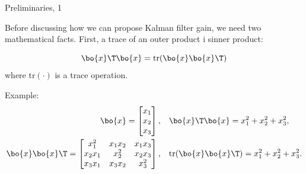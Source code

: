 \documentclass{beamer}
\begin{document}
\begin{frame}{Preliminaries, 1}
	\begin{flushleft}
		
		Before discussing how we can propose Kalman filter gain, we need two mathematical facts. First, a trace of an outer product i sinner product:
		
		\begin{equation}
			\bo{x}\T \bo{x} = \text{tr}(\bo{x}\bo{x}\T)
		\end{equation}
		where $\text{tr}(\cdot)$ is a trace operation.
	
	\bigskip
	
		Example:
		\begin{align*}
			\bo{x} = 
			\begin{bmatrix}
				x_1 \\ x_2 \\ x_3
			\end{bmatrix},& 
		\ \ \ 
		\bo{x}\T \bo{x} = x_1^2+x_2^2+x_3^2, 
		\\
		\bo{x}\bo{x}\T = 
		\begin{bmatrix}
			x_1^2    & x_1 x_2 & x_1 x_3 \\ 
			x_2 x_1 & x_2^2    & x_2 x_3 \\ 
			x_3 x_1 & x_3 x_2 & x_3^2
		\end{bmatrix},& 
	\ \ \
	\text{tr}(\bo{x}\bo{x}\T)  = x_1^2+x_2^2+x_3^2.
		\end{align*}	
	
	\end{flushleft}
\end{frame}
\end{document}
